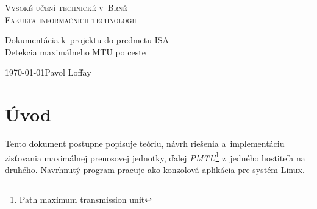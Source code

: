 \documentclass[12pt,a4paper,titlepage]{article}
\begin{document}
\begin{titlepage}
    \begin{center}
    {\Huge \textsc{Vysoké učení technické v~Brně\\}} 
    {\huge \textsc{Fakulta informačních technologií\\}} 
    \bigskip
    \bigskip
    \bigskip
    \begin{center}
     \end{center}
    \bigskip
    \bigskip
    \bigskip
    {\LARGE Dokumentácia k~projektu do predmetu ISA\\} 
    {\Huge Detekcia maximálneho MTU po ceste\\}
    \end{center}

    \Large{\today \hfill Pavol Loffay}
    \bigskip
\end{titlepage}

\setcounter{page}{1}
\tableofcontents

\newpage
{}
\setcounter{page}{1}

\section{Úvod} \label{uvod}
    Tento dokument postupne popisuje teóriu, návrh riešenia a~implementáciu
    zisťovania maximálnej prenosovej jednotky, ďalej
    \emph{PMTU}\footnote{Path maximum transmission unit} z~jedného hostiteľa na druhého.
    Navrhnutý program pracuje ako konzolová aplikácia pre systém Linux.
\end{document}
